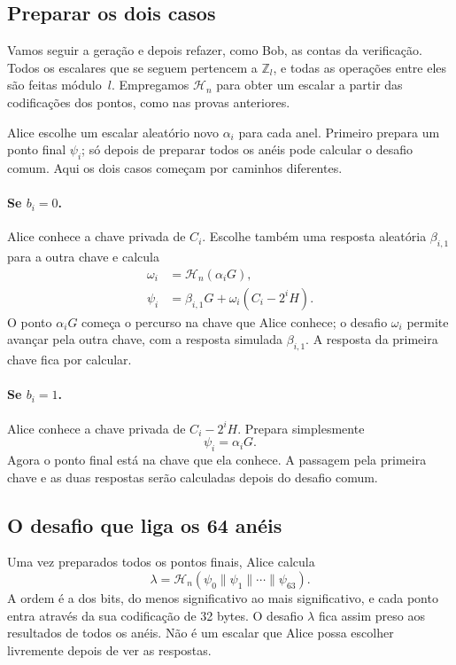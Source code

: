 \subsection{Preparar os dois casos}

Vamos seguir a geração e depois refazer, como Bob, as contas da verificação.
Todos os escalares que se seguem pertencem a \(\mathbb Z_l\), e todas as
operações entre eles são feitas módulo~\(l\). Empregamos \(\mathcal H_n\)
para obter um escalar a partir das codificações dos pontos, como nas provas
anteriores.

Alice escolhe um escalar aleatório novo \(\alpha_i\) para cada anel. Primeiro
prepara um ponto final \(\psi_i\); só depois de preparar todos os anéis pode
calcular o desafio comum. Aqui os dois casos começam por caminhos diferentes.

\paragraph{Se \(b_i=0\).}
Alice conhece a chave privada de \(C_i\). Escolhe também uma resposta
aleatória \(\beta_{i,1}\) para a outra chave e calcula
\begin{align*}
 \omega_i&=\mathcal H_n(\alpha_iG),\\
 \psi_i&=\beta_{i,1}G+\omega_i(C_i-2^iH).
\end{align*}
O ponto \(\alpha_iG\) começa o percurso na chave que Alice conhece; o
desafio \(\omega_i\) permite avançar pela outra chave, com a resposta
simulada \(\beta_{i,1}\). A resposta da primeira chave fica por calcular.

\paragraph{Se \(b_i=1\).}
Alice conhece a chave privada de \(C_i-2^iH\). Prepara simplesmente
\[
 \psi_i=\alpha_iG.
\]
Agora o ponto final está na chave que ela conhece. A passagem pela primeira
chave e as duas respostas serão calculadas depois do desafio comum.

\subsection{O desafio que liga os 64 anéis}

%
Uma vez preparados todos os pontos finais, Alice calcula
\begin{equation}
 \lambda=\mathcal H_n(\psi_0\mathbin\|\psi_1\mathbin\|\cdots
                         \mathbin\|\psi_{63}).
 \label{eq:borromean-common-challenge}
\end{equation}
A ordem é a dos bits, do menos significativo ao mais significativo, e cada
ponto entra através da sua codificação de 32 bytes. O desafio \(\lambda\)
fica assim preso aos resultados de todos os anéis. Não é um escalar que Alice
possa escolher livremente depois de ver as respostas.



